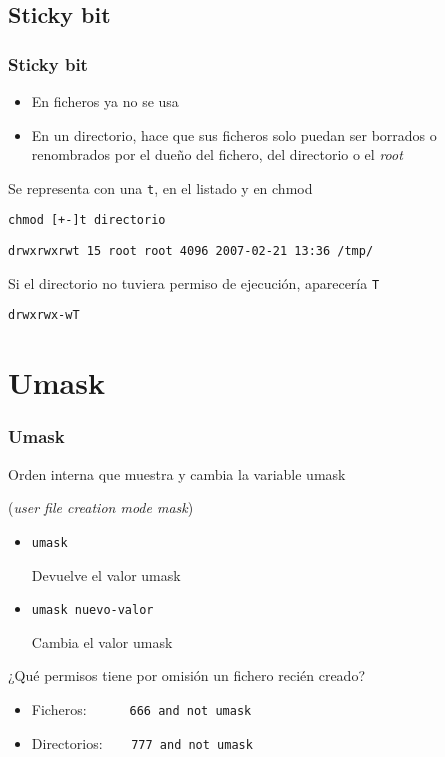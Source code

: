 \documentclass[ucs]{beamer}
\begin{document}
\subsection{Sticky bit}
\begin{frame}[fragile]
\frametitle{Sticky bit}
\begin{itemize}	
\item
En ficheros ya no se usa
\item
En un directorio, hace que sus ficheros solo puedan ser borrados o 
renombrados por el dueño del fichero, del directorio o el \emph{root}
\end{itemize}

Se representa con una \verb|t|, en el listado y en chmod

\begin{footnotesize}
\verb|chmod [+-]t directorio|

\verb|drwxrwxrwt 15 root root 4096 2007-02-21 13:36 /tmp/|
\end{footnotesize}


Si el directorio no tuviera permiso de ejecución, aparecería \verb|T|

\begin{footnotesize}
\verb|drwxrwx-wT|
\end{footnotesize}

\end{frame}



\section{Umask}

\begin{frame}[fragile]
\frametitle{Umask}
Orden interna que muestra y cambia la variable umask 

(\emph{user file creation mode mask})
\begin{itemize}	
\item \texttt{umask }

Devuelve el valor umask                
\item \texttt{umask nuevo-valor }

Cambia el valor umask   
\end{itemize}




¿Qué permisos tiene por omisión un fichero recién creado?
\begin{itemize}
\item
Ficheros:\verb|      666 and not umask|
\item
Directorios:\verb|    777 and not umask|
\end{itemize}

\end{frame}
\end{document}
